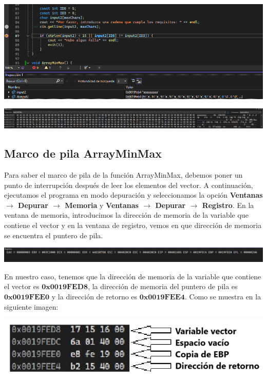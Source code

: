 \documentclass[11pt,a4paper]{article}
\begin{document}
\begin{center}
\includegraphics[width=\textwidth]{texto2.png}
\end{center}
\begin{center}
\includegraphics[width=\textwidth]{texto2Memoria.png}
\end{center}

\newpage

\subsection{Marco de pila ArrayMinMax}
Para saber el marco de pila de la función ArrayMinMax, debemos poner un punto de interrupción después de 
leer los elementos del vector. A continuación, ejecutamos el programa en modo depuración y seleccionamos la 
opción \textbf{Ventanas \(\rightarrow\) Depurar \(\rightarrow\) Memoria} y \textbf{Ventanas \(\rightarrow\) Depurar \(\rightarrow\) Registro}. 
En la ventana de memoria, introducimos la dirección de memoria de la variable que contiene el vector y en la ventana de registro, vemos en que dirección 
de memoria se encuentra el puntero de pila.
\begin{center}
  \includegraphics[width=\textwidth]{VentanaRegistros.png}
  \end{center}

\indent En nuestro caso, tenemos que la dirección de memoria de la variable que contiene el vector es \(\mathbf{0x0019FED8}\), la dirección de memoria del puntero de pila es \(\mathbf{0x0019FEE0}\) y la dirección de retorno es \(\mathbf{0x0019FEE4}\). Como se muestra en la siguiente imagen:
\begin{center}
\includegraphics[width=\textwidth]{VentanaMemoria.jpg}
\end{center}
\end{document}
